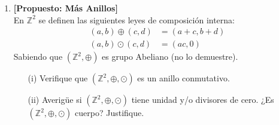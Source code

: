 \documentclass[letterpaper,10pt]{article}
\newcommand{\Z}{\mathbb Z}
\theoremstyle{plain}
\begin{document}
\begin{enumerate}[\bf P1.]
    \item \textbf{[Propuesto: Más Anillos]}\\En $\Z^2$ se definen las siguientes leyes de composición interna: 
        \begin{align*}
        (a,b)\oplus (c,d)&=(a+c,b+d)\\
        (a,b)\odot (c,d)&=(ac,0)
        \end{align*}
        Sabiendo que $(\Z^2,\oplus)$ es grupo Abeliano (no lo demuestre).
        \begin{enumerate}
        \item[(i)] Verifique que $(\Z^2,\oplus,\odot)$ es un anillo conmutativo.
        \item[(ii)] Averigüe si $(\Z^2,\oplus,\odot)$ tiene unidad y/o divisores de cero. ¿Es $(\Z^2,\oplus,\odot)$ cuerpo? Justifique.
        \end{enumerate}
\end{enumerate}
\end{document}
